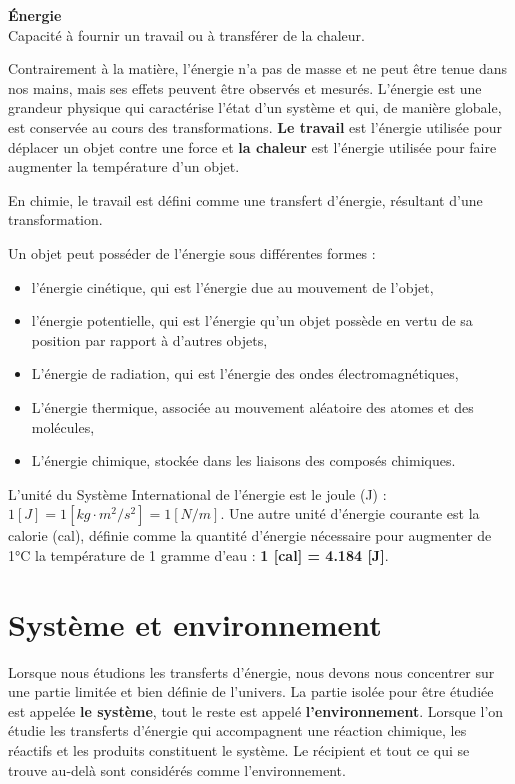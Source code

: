 \documentclass[
  11pt,
  a4paper,
  openany]{book}
\providecommand{\tightlist}{%
  \setlength{\itemsep}{0pt}\setlength{\parskip}{0pt}}
\begin{document}
\begin{tcolorbox}
\textbf{Énergie}\\
Capacité à fournir un travail ou à transférer de la chaleur.

\end{tcolorbox}

Contrairement à la matière, l'énergie n'a pas de masse et ne peut être tenue dans nos mains, mais ses effets peuvent être observés et mesurés. L'énergie est une grandeur physique qui caractérise l'état d'un système et qui, de manière globale, est conservée au cours des transformations. \textbf{Le travail} est l'énergie utilisée pour déplacer un objet contre une force et \textbf{la chaleur} est l'énergie utilisée pour faire augmenter la température d'un objet.

En chimie, le travail est défini comme une transfert d'énergie, résultant d'une transformation.

\clearpage

Un objet peut posséder de l'énergie sous différentes formes :

\begin{itemize}
\tightlist
\item
  l'énergie cinétique, qui est l'énergie due au mouvement de l'objet,
\item
  l'énergie potentielle, qui est l'énergie qu'un objet possède en vertu de sa position par rapport à d'autres objets,
\item
  L'énergie de radiation, qui est l'énergie des ondes électromagnétiques,
\item
  L'énergie thermique, associée au mouvement aléatoire des atomes et des molécules,
\item
  L'énergie chimique, stockée dans les liaisons des composés chimiques.
\end{itemize}

L'unité du Système International de l'énergie est le joule (J) : \(1 [J] = 1 [kg \cdot m^2 / s^2] = 1 [N/m]\). Une autre unité d'énergie courante est la calorie (cal), définie comme la quantité d'énergie nécessaire pour augmenter de 1°C la température de 1 gramme d'eau : \textbf{1 {[}cal{]} = 4.184 {[}J{]}}.

\section{Système et environnement}\label{systuxe8me-et-environnement}

Lorsque nous étudions les transferts d'énergie, nous devons nous concentrer sur une partie limitée et bien définie de l'univers. La partie isolée pour être étudiée est appelée \textbf{le système}, tout le reste est appelé \textbf{l'environnement}. Lorsque l'on étudie les transferts d'énergie qui accompagnent une réaction chimique, les réactifs et les produits constituent le système. Le récipient et tout ce qui se trouve au-delà sont considérés comme l'environnement.
\end{document}
